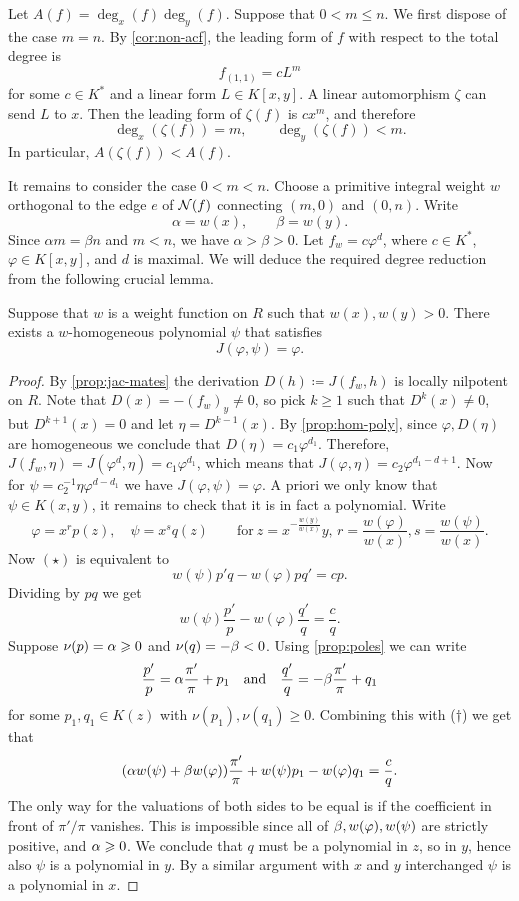 \documentclass[a4paper,10pt]{amsart}
\begin{document}
Let \(A(f)=\deg_x(f)\deg_y(f)\). Suppose that \(0<m\le n\). We first dispose of the case \(m=n\). By \cref{cor:non-acf}, the leading form of \(f\) with respect to the total degree is
\[f_{(1,1)}=cL^m\]
for some \(c\in K^*\) and a linear form \(L\in K[x,y]\). A linear automorphism \(\zeta\) can send \(L\) to \(x\). Then the leading form of \(\zeta(f)\) is \(cx^m\), and therefore
\[\deg_x(\zeta(f))=m,\qquad \deg_y(\zeta(f))<m.\]
In particular, \(A(\zeta(f))<A(f)\).

It remains to consider the case \(0<m<n\). Choose a primitive integral weight \(w\) orthogonal to the edge \(e\) of \(\mathcal{N}(f)\) connecting \((m,0)\) and \((0,n)\). Write
\[\alpha=w(x),\qquad \beta=w(y).\]
Since \(\alpha m=\beta n\) and \(m<n\), we have \(\alpha>\beta>0\). Let \(f_w=c\varphi^d\), where \(c\in K^*\), \(\varphi\in K[x,y]\), and \(d\) is maximal. We will deduce the required degree reduction from the following crucial lemma.
\begin{lemma}\label{lem:psi}
  Suppose that \(w\) is a weight function on \(R\) such that \(w(x),w(y)>0\).
  There exists a \(w\)-homogeneous polynomial \(\psi\) that satisfies
  \begin{equation}
    J(\varphi,\psi)=\varphi.     \tag{\(\star\)}
  \end{equation}
\end{lemma}
\begin{proof}
  By \cref{prop:jac-mates} the derivation \(D(h)\coloneqq J(f_w,h)\) is locally nilpotent on \(R\).
  Note that \(D(x)=-(f_w)_y\ne 0\), so 
  pick \(k\ge 1\) such that \(D^k(x)\ne 0\), but \(D^{k+1}(x)=0\) and let \(\eta=D^{k-1}(x)\). By \cref{prop:hom-poly},
  since \(\varphi,D(\eta)\) are homogeneous we conclude that \(D(\eta)=c_1\varphi^{d_1}\).
  Therefore, \(J(f_w,\eta)=J(\varphi^d,\eta)=c_1\varphi^{d_1}\), which means that \(J(\varphi,\eta)=c_2\varphi^{d_1-d+1}\). Now for \(\psi=c_2^{-1}\eta\varphi^{d-d_1}\) we have \(J(\varphi,\psi)=\varphi\).
  A priori we only know that \(\psi\in K(x,y)\), it remains to check that it is in fact a polynomial. Write
  \[\varphi=x^rp(z),\quad \psi=x^sq(z)\qquad \text{for} \ z=x^{-\frac{w(y)}{w(x)}}y,\, r=\frac{w(\varphi)}{w(x)},s=\frac{w(\psi)}{w(x)}.\]
  Now \((\star)\) is equivalent to
  \[w(\psi)p'q-w(\varphi)pq'=cp.\]
  Dividing by \(pq\) we get 
  \[\tag{\(\dagger\)}w(\psi)\frac{p'}{p}-w(\varphi)\frac{q'}{q}=\frac{c}{q}.\]
  Suppose \(\nu(p)=\alpha\geqslant 0\) and \(\nu(q)=-\beta < 0\).
  Using \cref{prop:poles} we can write 
  \[\frac{p'}{p}=\alpha \frac{\pi'}{\pi}+p_1\quad\text{and}\quad \frac{q'}{q}=-\beta \frac{\pi'}{\pi}+q_1\]
  for some \(p_1,q_1\in K(z)\) with \(\nu(p_1),\nu(q_1)\ge 0\).
  Combining this with (\(\dagger\)) we get that 
  \[(\alpha w(\psi)+\beta w(\varphi))\frac{\pi'}{\pi}+w(\psi)p_1-w(\varphi)q_1=\frac{c}{q}.\]
  The only way for the valuations of both sides to be equal is if the coefficient in front of \(\pi'/\pi\)  vanishes. This is impossible since all of \(\beta,w(\varphi),w(\psi)\) are strictly positive, 
  and \(\alpha\geqslant 0\).
  We conclude that \(q\) must be a polynomial in \(z\), so in \(y\), hence also \(\psi\) is a polynomial in \(y\). 
  By a similar argument with \(x\) and \(y\) interchanged \(\psi\) is a polynomial in \(x\).
\end{proof}
\end{document}

